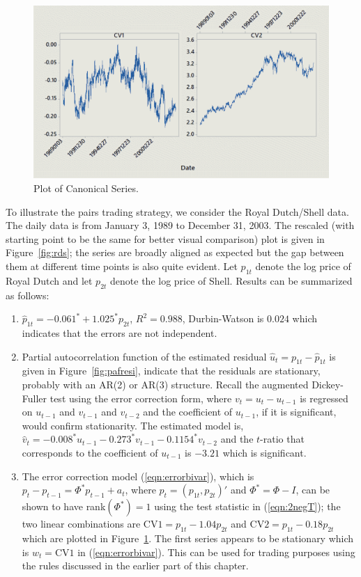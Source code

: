 	\begin{figure}[!ht]
	\centering
	\includegraphics[width=\textwidth]{chapters/chapter_stat_ts/figures/can.png}
	\caption{Plot of Canonical Series. \label{fig:can}}
	\end{figure}

To illustrate the pairs trading strategy, we consider the Royal Dutch/Shell data. The daily data is from January 3, 1989 to December 31, 2003. The rescaled (with starting point to be the same for better visual comparison) plot is given in Figure~\ref{fig:rds}; the series are broadly aligned as expected but the gap between them at different time points is also quite evident. Let $p_{1t}$ denote the log price of Royal Dutch and let $p_{2t}$ denote the log price of Shell. Results can be summarized as follows:
\begin{enumerate}[--]
\item $\hat{p}_{1t}= -0.061^* + 1.025^*p_{2t}$, $R^2=0.988$, Durbin-Watson is $0.024$ which indicates that the errors are not independent.
\item Partial autocorrelation function of the estimated residual $\hat{u}_t=p_{1t}-\hat{p}_{1t}$ is given in Figure~\ref{fig:pafresi}, indicate that the residuals are stationary, probably with an AR(2) or AR(3) structure. Recall the augmented Dickey-Fuller test using the error correction form, where $v_t=u_t-u_{t-1}$ is regressed on $u_{t-1}$ and $v_{t-1}$ and $v_{t-2}$ and the coefficient of $u_{t-1}$, if it is significant, would confirm stationarity. The estimated model is, $\hat{v}_t= -0.008^*u_{t-1} - 0.273^*v_{t-1} - 0.1154^* v_{t-2}$ and the $t$-ratio that corresponds to the coefficient of $u_{t-1}$ is $-3.21$ which is significant. 
\item The error correction model (\ref{eqn:errorbivar}), which is $p_t-p_{t-1}= \Phi^* p_{t-1} + a_t$, where $p_t=(p_{1t},p_{2t})'$ and $\Phi^*=\Phi-I$, can be shown to have rank$(\Phi^*)=1$ using the test statistic in (\ref{eqn:2negT}); the two linear combinations are $\text{CV1}=p_{1t} - 1.04 p_{2t}$ and $\text{CV2}= p_{1t} - 0.18 p_{2t}$ which are plotted in Figure~\ref{fig:can}. The first series appears to be stationary which is $w_t=\text{CV1}$ in (\ref{eqn:errorbivar}). This can be used for trading purposes using the rules discussed in the earlier part of this chapter. 
\end{enumerate}


